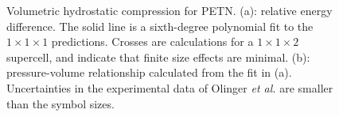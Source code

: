 \documentclass[prb,aps,nobibnotes,twocolumn,doublespace,twocolumngrid,superbib]{revtex4}
\begin{document}
\begin{figure}
\caption{Volumetric hydrostatic compression for PETN.
(a): relative energy difference. The solid line is a sixth-degree
polynomial fit to the $1\times 1\times 1$ predictions.  Crosses are
calculations for a $1\times 1\times 2$ supercell, and indicate that
finite size effects are minimal.  (b): pressure-volume relationship
calculated from the fit in (a).  Uncertainties in the experimental
data of Olinger {\it et al.}\cite{Olinger_1975v62} are smaller than
the symbol sizes.  }
\label{fig:volume_compress}
\end{figure}
\end{document}
